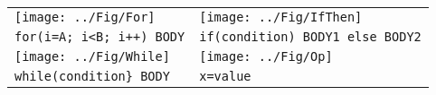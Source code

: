 
\begin{tabular}{|l|l|} \hline
    \texttt{[image: ../Fig/For]}    & \texttt{[image: ../Fig/IfThen]}      \\
    \verb-for(i=A; i<B; i++) BODY-  & \verb+if(condition) BODY1 else BODY2+\\ \hline

    \texttt{[image: ../Fig/While]}    & \texttt{[image: ../Fig/Op]}    \\
    \verb+while(condition} BODY+    & \verb+x=value+         \\ \hline
\end{tabular}

